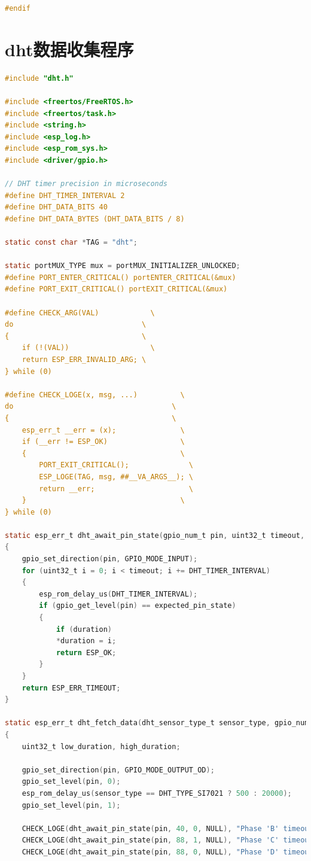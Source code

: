 \documentclass[UTF8]{ctexart}
\begin{document}
\begin{appendices}
\begin{lstlisting}[language=C, caption=OLED.h]
	#endif
\end{lstlisting}
\newpage
\section{dht数据收集程序}
\begin{lstlisting}[language=C, caption=dht.c]
#include "dht.h"

#include <freertos/FreeRTOS.h>
#include <freertos/task.h>
#include <string.h>
#include <esp_log.h>
#include <esp_rom_sys.h>
#include <driver/gpio.h>

// DHT timer precision in microseconds
#define DHT_TIMER_INTERVAL 2
#define DHT_DATA_BITS 40
#define DHT_DATA_BYTES (DHT_DATA_BITS / 8)

static const char *TAG = "dht";

static portMUX_TYPE mux = portMUX_INITIALIZER_UNLOCKED;
#define PORT_ENTER_CRITICAL() portENTER_CRITICAL(&mux)
#define PORT_EXIT_CRITICAL() portEXIT_CRITICAL(&mux)

#define CHECK_ARG(VAL)            \
do                              \
{                               \
	if (!(VAL))                   \
	return ESP_ERR_INVALID_ARG; \
} while (0)

#define CHECK_LOGE(x, msg, ...)          \
do                                     \
{                                      \
	esp_err_t __err = (x);               \
	if (__err != ESP_OK)                 \
	{                                    \
		PORT_EXIT_CRITICAL();              \
		ESP_LOGE(TAG, msg, ##__VA_ARGS__); \
		return __err;                      \
	}                                    \
} while (0)

static esp_err_t dht_await_pin_state(gpio_num_t pin, uint32_t timeout, int expected_pin_state, uint32_t *duration)
{
	gpio_set_direction(pin, GPIO_MODE_INPUT);
	for (uint32_t i = 0; i < timeout; i += DHT_TIMER_INTERVAL)
	{
		esp_rom_delay_us(DHT_TIMER_INTERVAL);
		if (gpio_get_level(pin) == expected_pin_state)
		{
			if (duration)
			*duration = i;
			return ESP_OK;
		}
	}
	return ESP_ERR_TIMEOUT;
}

static esp_err_t dht_fetch_data(dht_sensor_type_t sensor_type, gpio_num_t pin, uint8_t data[DHT_DATA_BYTES])
{
	uint32_t low_duration, high_duration;
	
	gpio_set_direction(pin, GPIO_MODE_OUTPUT_OD);
	gpio_set_level(pin, 0);
	esp_rom_delay_us(sensor_type == DHT_TYPE_SI7021 ? 500 : 20000);
	gpio_set_level(pin, 1);
	
	CHECK_LOGE(dht_await_pin_state(pin, 40, 0, NULL), "Phase 'B' timeout");
	CHECK_LOGE(dht_await_pin_state(pin, 88, 1, NULL), "Phase 'C' timeout");
	CHECK_LOGE(dht_await_pin_state(pin, 88, 0, NULL), "Phase 'D' timeout");
	

\end{lstlisting}
\end{appendices}
\end{document}

